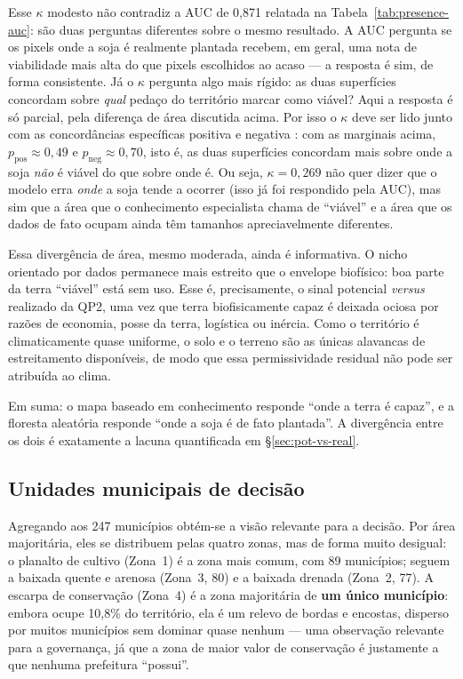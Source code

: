 Esse $\kappa$ modesto não contradiz a AUC de 0,871 relatada na Tabela~\ref{tab:presence-auc}:
são duas perguntas diferentes sobre o mesmo resultado. A AUC pergunta se os pixels onde a soja
é realmente plantada recebem, em geral, uma nota de viabilidade mais alta do que pixels
escolhidos ao acaso --- a resposta é sim, de forma consistente. Já o $\kappa$ pergunta algo mais
rígido: as duas superfícies concordam sobre \emph{qual} pedaço do território marcar como
viável? Aqui a resposta é só parcial, pela diferença de área discutida acima. Por isso o $\kappa$
deve ser lido junto com as concordâncias específicas positiva e negativa
\citep[pp.~551, 557]{cicchetti_high_1990}: com as marginais acima, $p_{\text{pos}} \approx 0{,}49$ e
$p_{\text{neg}} \approx 0{,}70$, isto é, as duas superfícies concordam mais sobre onde a soja
\emph{não} é viável do que sobre onde é.
Ou seja, $\kappa = 0{,}269$ não quer dizer que o modelo erra \emph{onde} a soja tende a ocorrer
(isso já foi respondido pela AUC), mas sim que a área que o conhecimento especialista chama
de ``viável'' e a área que os dados de fato ocupam ainda têm tamanhos apreciavelmente diferentes.

Essa divergência de área, mesmo moderada, ainda é informativa. O nicho orientado por dados
permanece mais estreito que o envelope biofísico: boa parte da terra ``viável'' está sem uso.
Esse é, precisamente, o sinal potencial \emph{versus} realizado da QP2, uma vez que terra
biofisicamente capaz é deixada ociosa por razões de economia, posse da terra, logística ou inércia.
Como o território é climaticamente quase uniforme, o solo e o terreno são as únicas alavancas de
estreitamento disponíveis, de modo que essa permissividade residual não pode ser atribuída ao
clima.

Em suma: o mapa baseado em conhecimento responde ``onde a terra é capaz'', e a floresta aleatória 
responde ``onde a soja é de fato plantada''. A divergência entre os dois
é exatamente a lacuna quantificada em \S\ref{sec:pot-vs-real}.

\subsection{Unidades municipais de decisão}\label{sec:municipal}

Agregando aos 247 municípios obtém-se a visão relevante para a decisão. Por área majoritária,
eles se distribuem pelas quatro zonas, mas de forma muito desigual: o planalto de cultivo
(Zona~1) é a zona mais comum, com 89 municípios; seguem a baixada quente e arenosa (Zona~3,
80) e a baixada drenada (Zona~2, 77). A escarpa de conservação (Zona~4) é a zona majoritária de
\textbf{um único município}: embora ocupe 10,8\% do território, ela é um relevo de bordas e
encostas, disperso por muitos municípios sem dominar quase nenhum --- uma observação relevante
para a governança, já que a zona de maior valor de conservação é justamente a que nenhuma
prefeitura ``possui''.

